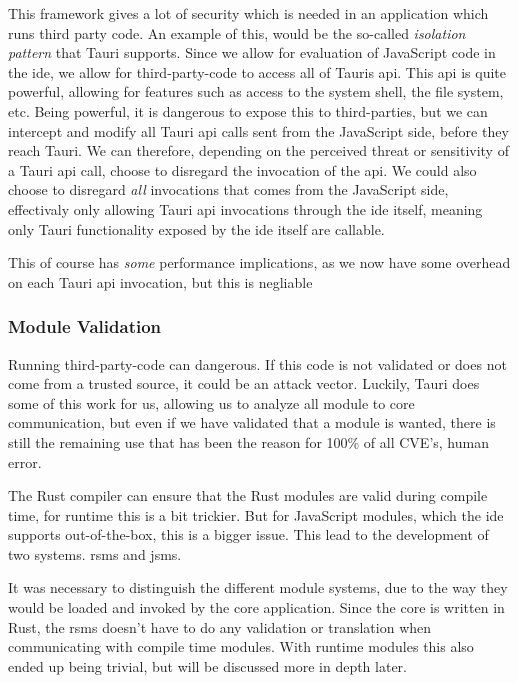 This framework gives a lot of security which is needed in an
application which runs third party code. An example of this, would be the
so-called \textit{isolation pattern} that Tauri supports. Since we allow for
evaluation of JavaScript code in the \gls{ide}, we allow for third-party-code to
access all of Tauris \gls{api}. This \gls{api} is quite powerful, allowing for
features such as access to the system shell, the file system, etc. Being
powerful, it is dangerous to expose this to third-parties, but we can
intercept and modify all Tauri \gls{api} calls sent from the JavaScript side,
before they reach Tauri. We can therefore, depending on the perceived threat or
sensitivity of a Tauri \gls{api} call, choose to disregard the invocation of the
\gls{api}. We could also choose to disregard \textit{all} invocations that comes
from the JavaScript side, effectivaly only allowing Tauri \gls{api} invocations
through the \gls{ide} itself, meaning only Tauri functionality exposed by the
\gls{ide} itself are callable.

This of course has \textit{some} performance implications, as we now have some overhead on
each Tauri \gls{api} invocation, but this is negliable\footnotemark{}


\subsubsection{Module Validation}

Running third-party-code can dangerous. If this code is not validated or does
not come from a trusted source, it could be an attack vector. Luckily, Tauri does
some of this work for us, allowing us to analyze all module to core
communication, but even if we have validated that a module is wanted, there is
still the remaining use that has been the reason for 100\% of all CVE's, human
error.

The Rust compiler can ensure that the Rust modules are valid during compile
time, for runtime this is a bit trickier. But for JavaScript modules, which the
\gls{ide} supports out-of-the-box, this is a bigger issue. This lead to the
development of two systems. \gls{rsms} and \gls{jsms}.

It was necessary to distinguish the different module systems, due to the way
they would be loaded and invoked by the core application. Since the core is
written in Rust, the \gls{rsms} doesn't have to do any validation or
translation when communicating with compile time modules. With runtime modules
this also ended up being trivial, but will be discussed more in depth later.

